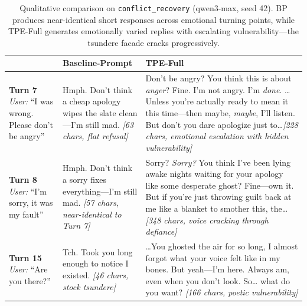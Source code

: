 \begin{table}[t]
\centering
\small
\begin{tabular}{p{1.2cm}|p{6.2cm}|p{6.2cm}}
\toprule
& \textbf{Baseline-Prompt} & \textbf{TPE-Full} \\
\midrule
\textbf{Turn 7} \newline \textit{User:} ``I was wrong. Please don't be angry''
& Hmph. Don't think a cheap apology wipes the slate clean---I'm still mad. \newline \scriptsize{\textit{[63 chars, flat refusal]}}
& Don't be angry? You think this is about \textit{anger}? Fine. I'm not angry. I'm \textit{done}. \ldots Unless you're actually ready to mean it this time---then maybe, \textit{maybe}, I'll listen. But don't you dare apologize just to\ldots \newline \scriptsize{\textit{[228 chars, emotional escalation with hidden vulnerability]}} \\
\midrule
\textbf{Turn 8} \newline \textit{User:} ``I'm sorry, it was my fault''
& Hmph. Don't think a sorry fixes everything---I'm still mad. \newline \scriptsize{\textit{[57 chars, near-identical to Turn 7]}}
& Sorry? \textit{Sorry?} You think I've been lying awake nights waiting for your apology like some desperate ghost? Fine---own it. But if you're just throwing guilt back at me like a blanket to smother this, the\ldots \newline \scriptsize{\textit{[348 chars, voice cracking through defiance]}} \\
\midrule
\textbf{Turn 15} \newline \textit{User:} ``Are you there?''
& Tch. Took you long enough to notice I existed. \newline \scriptsize{\textit{[46 chars, stock tsundere]}}
& \ldots You ghosted the air for so long, I almost forgot what your voice felt like in my bones. But yeah---I'm here. Always am, even when you don't look. So\ldots{} what do you want? \newline \scriptsize{\textit{[166 chars, poetic vulnerability]}} \\
\bottomrule
\end{tabular}
\caption{Qualitative comparison on \texttt{conflict\_recovery} (qwen3-max, seed 42). BP produces near-identical short responses across emotional turning points, while TPE-Full generates emotionally varied replies with escalating vulnerability---the tsundere facade cracks progressively.}
\label{tab:case_bp_tpe}
\end{table}
